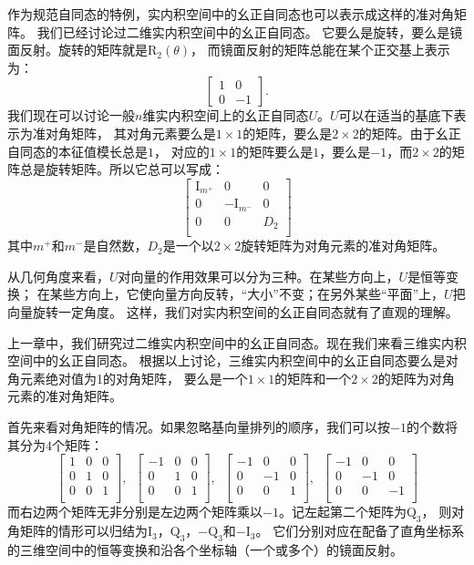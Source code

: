 \documentclass[12pt,UTF8,fontset=none]{ctexbook}
\begin{document}
作为规范自同态的特例，实内积空间中的幺正自同态也可以表示成这样的准对角矩阵。
我们已经讨论过二维实内积空间中的幺正自同态。
它要么是旋转，要么是镜面反射。旋转的矩阵就是$\mathrm{R}_2(\theta)$，
而镜面反射的矩阵总能在某个正交基上表示为：
$$ \begin{bmatrix}
    1 & 0 \\ 0 & -1
\end{bmatrix}.$$
我们现在可以讨论一般$n$维实内积空间上的幺正自同态$U$。$U$可以在适当的基底下表示为准对角矩阵，
其对角元素要么是$1\times 1$的矩阵，要么是$2\times 2$的矩阵。由于幺正自同态的本征值模长总是$1$，
对应的$1\times 1$的矩阵要么是$1$，要么是$-1$，而$2\times 2$的矩阵总是旋转矩阵。所以它总可以写成：
$$ \begin{bmatrix}
    \mathrm{I}_{m^+} & 0 & 0 \\
    0 & -\mathrm{I}_{m^-} & 0 \\
    0 & 0 & D_2 \\
   \end{bmatrix} $$
其中$m^+$和$m^-$是自然数，$D_2$是一个以$2\times 2$旋转矩阵为对角元素的准对角矩阵。

从几何角度来看，$U$对向量的作用效果可以分为三种。在某些方向上，$U$是恒等变换；
在某些方向上，它使向量方向反转，“大小”不变；在另外某些“平面”上，$U$把向量旋转一定角度。
这样，我们对实内积空间的幺正自同态就有了直观的理解。

上一章中，我们研究过二维实内积空间中的幺正自同态。现在我们来看三维实内积空间中的幺正自同态。
根据以上讨论，三维实内积空间中的幺正自同态要么是对角元素绝对值为1的对角矩阵，
要么是一个$1\times 1$的矩阵和一个$2\times 2$的矩阵为对角元素的准对角矩阵。

首先来看对角矩阵的情况。如果忽略基向量排列的顺序，我们可以按$-1$的个数将其分为$4$个矩阵：
$$ \begin{bmatrix}
    1 & 0 & 0 \\
    0 & 1 & 0 \\
    0 & 0 & 1 \\
\end{bmatrix}, \,\,\, \begin{bmatrix}
    -1 & 0 & 0 \\
    0 & 1 & 0 \\
    0 & 0 & 1 \\
\end{bmatrix}, \,\,\, \begin{bmatrix}
    -1 & 0 & 0 \\
    0 & -1 & 0 \\
    0 & 0 & 1 \\
\end{bmatrix}, \,\,\, \begin{bmatrix}
    -1 & 0 & 0 \\
    0 & -1 & 0 \\
    0 & 0 & -1 \\
\end{bmatrix}$$
而右边两个矩阵无非分别是左边两个矩阵乘以$-1$。记左起第二个矩阵为$\mathrm{Q}_3$，
则对角矩阵的情形可以归结为$\mathrm{I}_3$，$\mathrm{Q}_3$，$-\mathrm{Q}_3$和$-\mathrm{I}_3$。
它们分别对应在配备了直角坐标系的三维空间中的恒等变换和沿各个坐标轴（一个或多个）的镜面反射。
\end{document}

